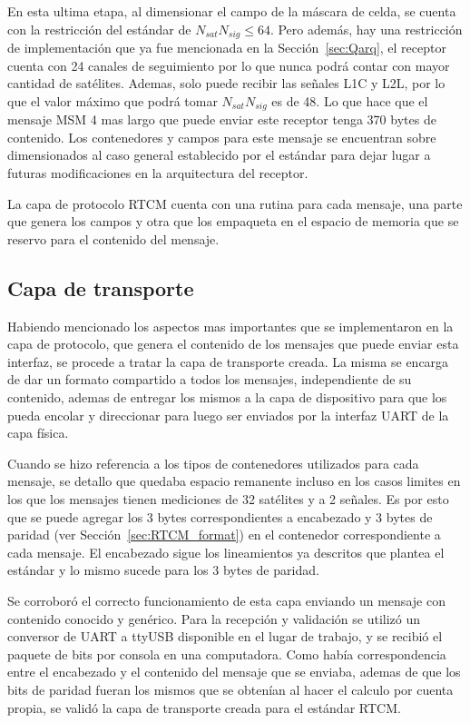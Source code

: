 \documentclass[a4paper,12pt,oneside,onecolumn,final,openright]{book}%
\begin{document}
	En esta ultima etapa, al dimensionar el campo de la máscara de celda, se cuenta con la restricción del estándar de $N_{sat}N_{sig}\leq 64$. Pero además, hay una restricción de implementación que ya fue mencionada en la Sección~\ref{sec:Qarq}, el receptor cuenta con 24 canales de seguimiento por lo que nunca podrá contar con mayor cantidad de satélites. Ademas, solo puede recibir las señales L1C y L2L, por lo que el valor máximo que podrá tomar $N_{sat}N_{sig}$ es de 48. Lo que hace que el mensaje MSM 4 mas largo que puede enviar este receptor tenga 370 bytes de contenido. Los contenedores y campos para este mensaje se encuentran sobre dimensionados al caso general establecido por el estándar para dejar lugar a futuras modificaciones en la arquitectura del receptor.
	
	La capa de protocolo RTCM cuenta con una rutina para cada mensaje, una parte que genera los campos y otra que los empaqueta en el espacio de memoria que se reservo para el contenido del mensaje. 
\subsection{Capa de transporte}
	Habiendo mencionado los aspectos mas importantes que se implementaron en la capa de protocolo, que genera el contenido de los mensajes que puede enviar esta interfaz, se procede a tratar la capa de transporte creada. La misma se encarga de dar un formato compartido a todos los mensajes, independiente de su contenido, ademas de entregar los mismos a la capa de dispositivo para que los pueda encolar y direccionar para luego ser enviados por la interfaz UART de la capa física.
	
	Cuando se hizo referencia a los tipos de contenedores utilizados para cada mensaje, se detallo que quedaba espacio remanente incluso en los casos limites en los que los mensajes tienen mediciones de 32 satélites y a 2 señales. Es por esto que se puede agregar los 3 bytes correspondientes a encabezado y 3 bytes de paridad (ver Sección~\ref{sec:RTCM_format}) en el contenedor correspondiente a cada mensaje. El encabezado sigue los lineamientos ya descritos que plantea el estándar y lo mismo sucede para los 3 bytes de paridad.
	
	Se corroboró el correcto funcionamiento de esta capa enviando un mensaje con contenido conocido y genérico. Para la recepción y validación se utilizó un conversor de UART a ttyUSB disponible en el lugar de trabajo, y se recibió el paquete de bits por consola en una computadora. Como había correspondencia entre el encabezado y el contenido del mensaje que se enviaba, ademas de que los bits de paridad fueran los mismos que se obtenían al hacer el calculo por cuenta propia, se validó la capa de transporte creada para el estándar RTCM.
\end{document}
